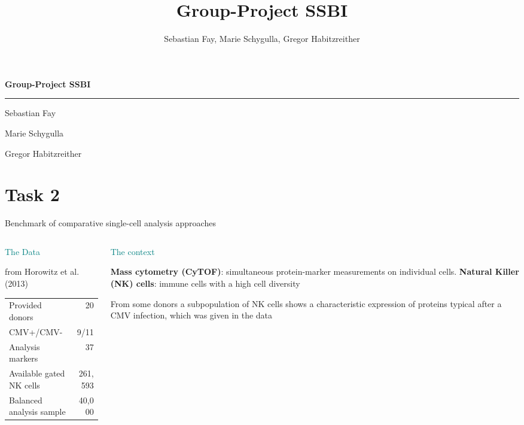 \documentclass[aspectratio=169,10pt]{beamer}
\title{Group-Project SSBI}
\author{Sebastian Fay, Marie Schygulla, Gregor Habitzreither}
\date{}
\newcommand{\slidelabel}{SSBI}
\begin{document}
\begin{frame}
  \vfill
  {\color{Ink}\LARGE\bfseries Group-Project SSBI\par}
  \vspace{4mm}
  {\color{Teal}\rule{32mm}{0.7pt}\par}
  \vspace{6mm}
  {\large Sebastian Fay\par}
  \smallskip
  {\large Marie Schygulla\par}
  \smallskip
  {\large Gregor Habitzreither\par}
  \vfill
\end{frame}

\renewcommand{\slidelabel}{SSBI · Task 2}
\section{Task 2}
\begin{frame}{Benchmark of comparative single-cell analysis approaches}
  \begin{columns}[T,onlytextwidth]
  \begin{column}{.45\textwidth}
    \textcolor{Teal}{\large The Data}\par\medskip
    from Horowitz et al. (2013)
    \par\medskip
    \begin{tabular}{lr}\toprule
      Provided donors & 20\\
      CMV+/CMV- & 9/11\\
      Analysis markers & 37\\
      Available gated NK cells & 261,593\\
      Balanced analysis sample & 40,000\\\bottomrule
    \end{tabular}
  \end{column}
  \begin{column}{.42\textwidth}
    \textcolor{Teal}{\large The context}\par\medskip
    \textbf{Mass cytometry (CyTOF)}: simultaneous protein-marker measurements on individual cells.
    \textbf{Natural Killer (NK) cells}: immune cells with a high cell diversity
    \par\medskip
    From some donors a subpopulation of NK cells shows a characteristic expression of proteins typical after a CMV infection, which was given in the data
    \par\medskip
  \end{column}
  \end{columns}
\end{frame}
\end{document}

